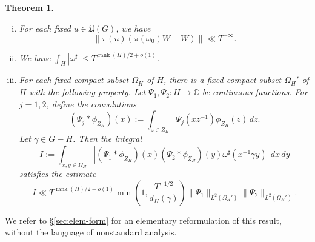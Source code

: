 \documentclass[reqno]{amsart}
\DeclareMathOperator{\trace}{trace}
\DeclareMathOperator{\rank}{rank}
\theoremstyle{plain} \newtheorem{theorem} {Theorem}
\theoremstyle{definition} \newtheorem{definition} [theorem] {Definition}
\theoremstyle{itplain} %
\numberwithin{equation}{section}
\numberwithin{theorem}{section}
\renewcommand{\leq}{\leqslant}
\begin{document}
\begin{theorem}
\begin{enumerate}[(i)]
  \begin{equation*}
    Z(W,f[0]) \gg T^{- \dim(H)/4}.
  \end{equation*}
  For each $s \in \mathfrak{a}_{\mathbb{C}}^*$ with $\Re(s) \ll 1$, we have the upper bound
  \begin{equation*}
    Z(W,f[s]) \ll  T ^{\rank(G) \trace(s)/2 - \dim(H)/4 + o(1) }
    (1 + |s|)^{-\infty }.
  \end{equation*}
\item \label{itm:sub-gln:1} For each fixed $u \in \mathfrak{U}(G)$, we have
  \begin{equation*}
    \|\pi(u) ( \pi(\omega_0) W - W)\| \ll T^{-\infty}.
  \end{equation*}
\item \label{itm:sub-gln:f-L-one-H}   We have $\int_{H} |\omega^\sharp| \leq T^{\rank(H)/2 + o(1)}$.
\item \label{itm:sub-gln:3}  For each fixed compact subset $\Omega_H$ of $H$, there is a fixed compact subset $\Omega_H'$ of $H$ with the following property.  Let $\Psi_1, \Psi_2 : H \rightarrow \mathbb{C}$ be continuous functions.  For $j=1,2$, define the convolutions
  \begin{equation*}
(\Psi_j \ast \phi_{Z_H})(x) := \int _{z \in Z_H} \Psi_j(x z^{-1}) \phi_{Z_H}(z) \, d z.
\end{equation*}
 Let $\gamma \in \bar{G} - H$.  Then the integral
 \begin{equation}\label{eq:i-:=-int-1}
      I := \int _{x, y \in \Omega_H }
    \left\lvert
      (\Psi_1 \ast \phi_{Z_H})(x)
      (\Psi_2 \ast \phi_{Z_H})(y)
      \omega^\sharp(x^{-1} \gamma y)
    \right\rvert
    \, d x \, d y
  \end{equation}
  satisfies the estimate
\begin{equation*}
  I \ll
  T^{\rank(H)/2 + o(1)}
  \min\left( 1,
    \frac{T^{-1/2}}{ d_H(\gamma)}
  \right)
    \|\Psi_1\|_{L^2(\Omega_H')}
    \|\Psi_2\|_{L^2(\Omega_H')}.
  \end{equation*}
\end{enumerate}
\end{theorem}
We refer to \S\ref{sec:elem-form} for an elementary reformulation of this result, without the language of nonstandard analysis.
\end{document}
